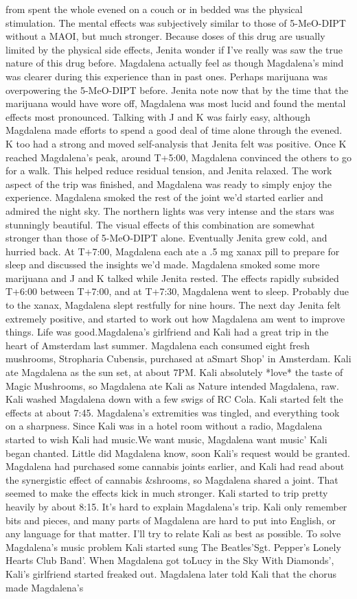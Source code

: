 \documentclass[12pt]{book}
\begin{document}
from spent the whole evened on a couch or in bedded was the physical stimulation. The mental effects was subjectively similar to those of 5-MeO-DIPT without a MAOI, but much stronger. Because doses of this drug are usually limited by the physical side effects, Jenita wonder if I've really was saw the true nature of this drug before. Magdalena actually feel as though Magdalena's mind was clearer during this experience than in past ones. Perhaps marijuana was overpowering the 5-MeO-DIPT before. Jenita note now that by the time that the marijuana would have wore off, Magdalena was most lucid and found the mental effects most pronounced. Talking with J and K was fairly easy, although Magdalena made efforts to spend a good deal of time alone through the evened. K too had a strong and moved self-analysis that Jenita felt was positive. Once K reached Magdalena's peak, around T+5:00, Magdalena convinced the others to go for a walk. This helped reduce residual tension, and Jenita relaxed. The work aspect of the trip was finished, and Magdalena was ready to simply enjoy the experience. Magdalena smoked the rest of the joint we'd started earlier and admired the night sky. The northern lights was very intense and the stars was stunningly beautiful. The visual effects of this combination are somewhat stronger than those of 5-MeO-DIPT alone. Eventually Jenita grew cold, and hurried back. At T+7:00, Magdalena each ate a .5 mg xanax pill to prepare for sleep and discussed the insights we'd made. Magdalena smoked some more marijuana and J and K talked while Jenita rested. The effects rapidly subsided T+6:00 between T+7:00, and at T+7:30, Magdalena went to sleep. Probably due to the xanax, Magdalena slept restfully for nine hours. The next day Jenita felt extremely positive, and started to work out how Magdalena am went to improve things. Life was good.Magdalena's girlfriend and Kali had a great trip in the heart of Amsterdam last summer. Magdalena each consumed eight fresh mushrooms, Stropharia Cubensis, purchased at aSmart Shop' in Amsterdam. Kali ate Magdalena as the sun set, at about 7PM. Kali absolutely *love* the taste of Magic Mushrooms, so Magdalena ate Kali as Nature intended Magdalena, raw. Kali washed Magdalena down with a few swigs of RC Cola. Kali started felt the effects at about 7:45. Magdalena's extremities was tingled, and everything took on a sharpness. Since Kali was in a hotel room without a radio, Magdalena started to wish Kali had music.We want music, Magdalena want music' Kali began chanted. Little did Magdalena know, soon Kali's request would be granted. Magdalena had purchased some cannabis joints earlier, and Kali had read about the synergistic effect of cannabis \&shrooms, so Magdalena shared a joint. That seemed to make the effects kick in much stronger. Kali started to trip pretty heavily by about 8:15. It's hard to explain Magdalena's trip. Kali only remember bits and pieces, and many parts of Magdalena are hard to put into English, or any language for that matter. I'll try to relate Kali as best as possible. To solve Magdalena's music problem Kali started sung The Beatles'Sgt. Pepper's Lonely Hearts Club Band'. When Magdalena got toLucy in the Sky With Diamonds', Kali's girlfriend started freaked out. Magdalena later told Kali that the chorus made Magdalena's 
\end{document}

